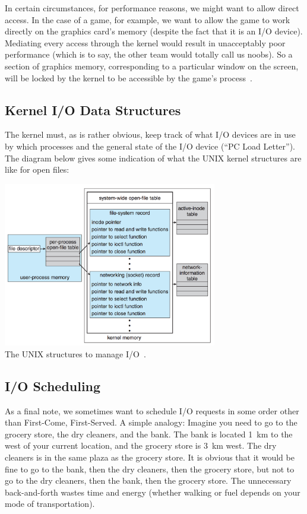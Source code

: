 In certain circumstances, for performance reasons, we might want to allow direct access. In the case of a game, for example, we want to allow the game to work directly on the graphics card's memory (despite the fact that it is an I/O device). Mediating every access through the kernel would result in unacceptably poor performance (which is to say, the other team would totally call us noobs). So a section of graphics memory, corresponding to a particular window on the screen, will be locked by the kernel to be accessible by the game's process~\cite{osc}.

\subsection*{Kernel I/O Data Structures}
The kernel must, as is rather obvious, keep track of what I/O devices are in use by which processes and the general state of the I/O device (``PC Load Letter''). The diagram below gives some indication of what the UNIX kernel structures are like for open files:

\begin{center}
	\includegraphics[width=0.7\textwidth]{images/unix-io-kernel.png}\\
	The UNIX structures to manage I/O~\cite{osc}.
\end{center}

\subsection*{I/O Scheduling}

As a final note, we sometimes want to schedule I/O requests in some order other than First-Come, First-Served. A simple analogy: Imagine you need to go to the grocery store, the dry cleaners, and the bank. The bank is located 1~km to the west of your current location, and the grocery store is 3~km west. The dry cleaners is in the same plaza as the grocery store. It is obvious that it would be fine to go to the bank, then the dry cleaners, then the grocery store, but not to go to the dry cleaners, then the bank, then the grocery store. The unnecessary back-and-forth wastes time and energy (whether walking or fuel depends on your mode of transportation).

